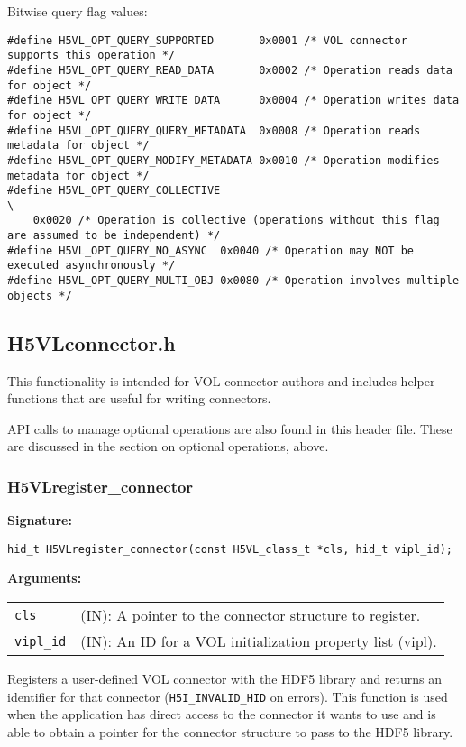 Bitwise query flag values:
\begin{lstlisting}
#define H5VL_OPT_QUERY_SUPPORTED       0x0001 /* VOL connector supports this operation */
#define H5VL_OPT_QUERY_READ_DATA       0x0002 /* Operation reads data for object */
#define H5VL_OPT_QUERY_WRITE_DATA      0x0004 /* Operation writes data for object */
#define H5VL_OPT_QUERY_QUERY_METADATA  0x0008 /* Operation reads metadata for object */
#define H5VL_OPT_QUERY_MODIFY_METADATA 0x0010 /* Operation modifies metadata for object */
#define H5VL_OPT_QUERY_COLLECTIVE                                                                            \
    0x0020 /* Operation is collective (operations without this flag are assumed to be independent) */
#define H5VL_OPT_QUERY_NO_ASYNC  0x0040 /* Operation may NOT be executed asynchronously */
#define H5VL_OPT_QUERY_MULTI_OBJ 0x0080 /* Operation involves multiple objects */

\end{lstlisting}
\bigskip


\subsection{H5VLconnector.h}

This functionality is intended for VOL connector authors and includes helper
functions that are useful for writing connectors.

API calls to manage optional operations are also found in this header file.
These are discussed in the section on optional operations, above.

\subsubsection{H5VLregister\_connector}
\begin{mdframed}[style=bgbox]
\textbf{Signature:}
\begin{lstlisting}
hid_t H5VLregister_connector(const H5VL_class_t *cls, hid_t vipl_id);
\end{lstlisting}
\textbf{Arguments:}\\
\begin{tabular}{l p{13.5cm}}
  {\tt cls} & (IN): A pointer to the connector structure to register.\\
  {\tt vipl\_id} & (IN): An ID for a VOL initialization property list (vipl).\\
\end{tabular}
\end{mdframed}
Registers a user-defined VOL connector with the HDF5 library and returns an identifier for that connector (\texttt{H5I\_INVALID\_HID} on errors). This function is used when the application has direct access to the connector it wants to use and is able to obtain a pointer for the connector structure to pass to the HDF5 library.
\bigskip


